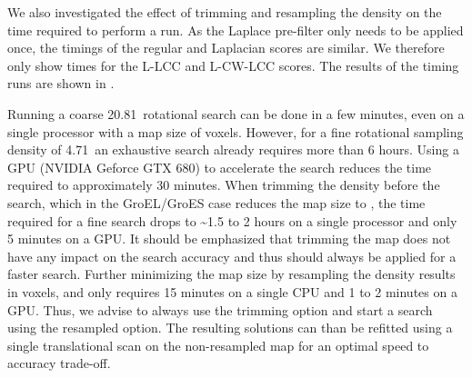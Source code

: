 {}

{}



We also investigated the effect of trimming and resampling the density on the
time required to perform a run. As the Laplace pre-filter only needs to be
applied once, the timings of the regular and Laplacian scores are similar. We
therefore only show times for the L-LCC and L-CW-LCC scores. The results of the
timing runs are shown in .

Running a coarse 20.81\Deg\ rotational search can be done in a few minutes, even on
a single processor with a map size of  voxels.
However, for a fine rotational sampling density of 4.71\Deg\ an exhaustive search
already requires more than 6 hours. Using a GPU (NVIDIA Geforce GTX 680) to
accelerate the search reduces the time required to approximately 30 minutes.
When trimming the density before the search, which in the GroEL/GroES case
reduces the map size to , the time required for a fine
search drops to \textasciitilde1.5 to 2 hours on a single processor and only 5 minutes on a
GPU. It should be emphasized that trimming the map does not have any impact on
the search accuracy and thus should always be applied for a faster search.
Further minimizing the map size by resampling the density results in  voxels, and only requires 15 minutes on a single CPU and 1 to 2
minutes on a GPU. Thus, we advise to always use the trimming option and start a
search using the resampled option. The resulting solutions can than be refitted
using a single translational scan on the non-resampled map for an optimal speed
to accuracy trade-off.

{}

